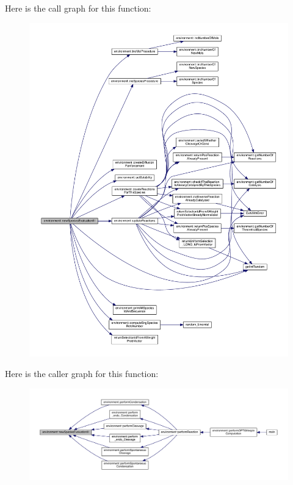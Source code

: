 Here is the call graph for this function\-:\nopagebreak
\begin{figure}[H]
\begin{center}
\leavevmode
\includegraphics[width=350pt]{a00014_a4fe7891fb38f3f25bb82769af0ddfe19_cgraph}
\end{center}
\end{figure}




Here is the caller graph for this function\-:\nopagebreak
\begin{figure}[H]
\begin{center}
\leavevmode
\includegraphics[width=350pt]{a00014_a4fe7891fb38f3f25bb82769af0ddfe19_icgraph}
\end{center}
\end{figure}


